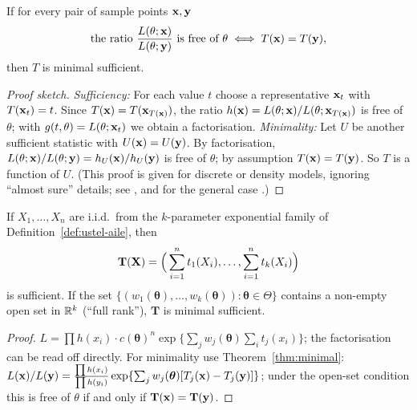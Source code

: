 \documentclass[main.tex]{subfiles}
\begin{document}
\begin{theorem}\label{thm:minimal}
If for every pair of sample points $\mathbf{x},\mathbf y$
\[
\text{the ratio }\frac{L(\theta;\mathbf{x})}{L(\theta;\mathbf y)}\ \text{is free of }\theta\iff T(\mathbf{x})=T(\mathbf y),
\]
then $T$ is minimal sufficient.
\end{theorem}
\begin{proof}[Proof sketch]
\emph{Sufficiency:} For each value $t$ choose a representative $\mathbf{x}_t$ with $T(\mathbf{x}_t)=t$. Since $T(\mathbf{x})=T(\mathbf{x}_{T(\mathbf{x})})$, the ratio $h(\mathbf{x})=L(\theta;\mathbf{x})/L(\theta;\mathbf{x}_{T(\mathbf{x})})$ is free of $\theta$; with $g(t,\theta)=L(\theta;\mathbf{x}_t)$ we obtain a factorisation.
\emph{Minimality:} Let $U$ be another sufficient statistic with $U(\mathbf{x})=U(\mathbf y)$. By factorisation, $L(\theta;\mathbf{x})/L(\theta;\mathbf y)=h_U(\mathbf{x})/h_U(\mathbf y)$ is free of $\theta$; by assumption $T(\mathbf{x})=T(\mathbf y)$. So $T$ is a function of $U$. (This proof is given for discrete or density models, ignoring ``almost sure'' details; see \cite[Theorem~6.2.13]{casella}, and for the general case \cite[Section~1.6]{lehmann-casella}.)
\end{proof}

\begin{theorem}\label{thm:ustel-yeterli}
If $X_1,\dots,X_n$ are i.i.d.\ from the $k$-parameter exponential family of Definition~\ref{def:ustel-aile}, then
\[
\mathbf T(\mathbf{X})=\Big(\sum_{i=1}^n t_1(X_i),\dots,\sum_{i=1}^n t_k(X_i)\Big)
\]
is sufficient. If the set $\{(w_1(\bm\theta),\dots,w_k(\bm\theta)):\bm\theta\in\Theta\}$ contains a non-empty open set in $\mathbb{R}^k$ (``full rank''), $\mathbf T$ is minimal sufficient.
\end{theorem}
\begin{proof}
$L=\prod h(x_i)\cdot c(\bm\theta)^n\exp\{\sum_j w_j(\bm\theta)\sum_i t_j(x_i)\}$; the factorisation can be read off directly. For minimality use Theorem~\ref{thm:minimal}: $L(\mathbf{x})/L(\mathbf y)=\frac{\prod h(x_i)}{\prod h(y_i)}\exp\{\sum_jw_j(\bm\theta)[T_j(\mathbf{x})-T_j(\mathbf y)]\}$; under the open-set condition this is free of $\theta$ if and only if $\mathbf T(\mathbf{x})=\mathbf T(\mathbf y)$.
\end{proof}
\end{document}
